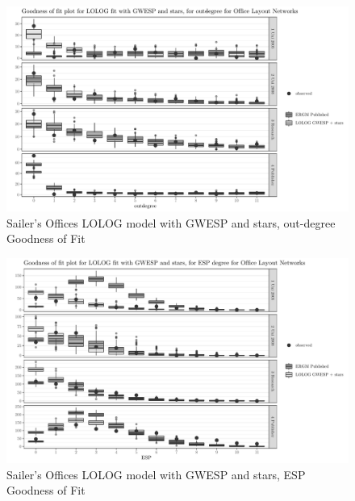 \documentclass[
]{statsoc}
\begin{document}
\begin{figure}[h]

{\centering \includegraphics{lolog_catelog_writeup_JRSSA_major_revisions_git_files/figure-latex/unnamed-chunk-12-1} 

}

\caption{\label{fig:sailer_gof_gwesp_star_odeg} Sailer's Offices LOLOG model with GWESP and stars, out-degree Goodness of Fit}\label{fig:unnamed-chunk-12}
\end{figure}

\begin{figure}[h]

{\centering \includegraphics{lolog_catelog_writeup_JRSSA_major_revisions_git_files/figure-latex/unnamed-chunk-13-1} 

}

\caption{\label{fig:sailer_gof_gwesp_star_esp}Sailer's Offices LOLOG model with GWESP and stars, ESP Goodness of Fit}\label{fig:unnamed-chunk-13}
\end{figure}
\end{document}
